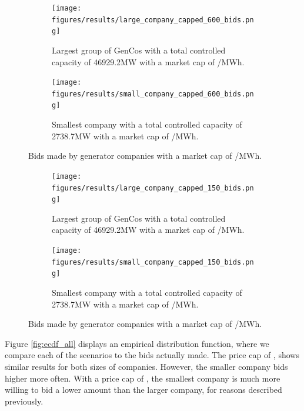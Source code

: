 \documentclass[conference]{IEEEtran}
\begin{document}
\begin{figure}
\centering
\begin{subfigure}[b]{0.49\textwidth}   
\texttt{[image: figures/results/large\_company\_capped\_600\_bids.png]}
\caption{Largest group of GenCos with a total controlled capacity of 46929.2MW with a market cap of /MWh.}
\label{fig:large_company_capped_600_bids}
\end{subfigure}
\hfil
\begin{subfigure}[b]{0.49\textwidth}   
\texttt{[image: figures/results/small\_company\_capped\_600\_bids.png]}
\caption{Smallest company with a total controlled capacity of 2738.7MW with a market cap of /MWh.}
\label{fig:small_company_capped_600_bids}
\end{subfigure}
\caption{Bids made by generator companies with a market cap of /MWh.}
\label{fig:capped_600_bids}
\end{figure}




\begin{figure}
\centering
\begin{subfigure}[b]{0.49\textwidth}   
\texttt{[image: figures/results/large\_company\_capped\_150\_bids.png]}
\caption{Largest group of GenCos with a total controlled capacity of 46929.2MW with a market cap of /MWh.}
\label{fig:large_company_capped_150_bids}
\end{subfigure}
\hfil
\begin{subfigure}[b]{0.49\textwidth}   
\texttt{[image: figures/results/small\_company\_capped\_150\_bids.png]}
\caption{Smallest company with a total controlled capacity of 2738.7MW with a market cap of /MWh.}
\label{fig:small_company_capped_150_bids}
\end{subfigure}
\caption{Bids made by generator companies with a market cap of /MWh.}
\label{fig:capped_150_bids}
\end{figure}

Figure \ref{fig:ecdf_all} displays an empirical distribution function, where we compare each of the scenarios to the bids actually made. The price cap of , shows similar results for both sizes of companies. However, the smaller company bids higher more often. With a price cap of , the smallest company is much more willing to bid a lower amount than the larger company, for reasons described previously.
\end{document}

